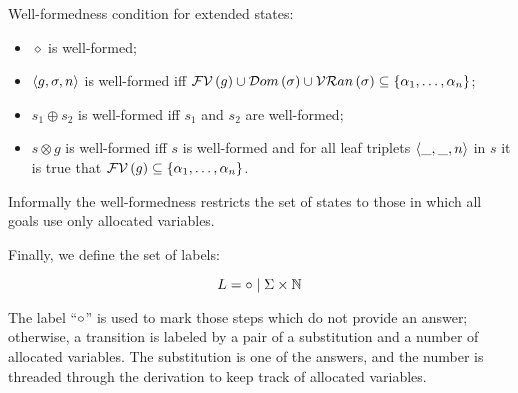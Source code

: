 \begin{definition}
  Well-formedness condition for extended states:
  
  \begin{itemize}
  \item $\diamond$ is well-formed;
  \item $\left<{g, \sigma, n}\right>$ is well-formed iff $\mathcal{FV}\,({g})\cup\mathcal{D}om\,({\sigma})\cup\mathcal{VR}an\,({\sigma})\subseteq\{\alpha_1,\dots,\alpha_n\}$;
  \item $s_1\oplus s_2$ is well-formed iff $s_1$ and $s_2$ are well-formed;
  \item $s\otimes g$ is well-formed iff $s$ is well-formed and for all leaf triplets $\left<{\_,\_,n}\right>$ in $s$ it is true that $\mathcal{FV}\,({g})\subseteq\{\alpha_1,\dots,\alpha_n\}$.
  \end{itemize}
  
\end{definition}

Informally the well-formedness restricts the set of states to those in which all goals use only allocated variables.

Finally, we define the set of labels:

\[
L = \circ \mid \Sigma\times \mathbb{N}
\]

The label ``$\circ$'' is used to mark those steps which do not provide an answer; otherwise, a transition is labeled by a pair of a substitution and a number of allocated
variables. The substitution is one of the answers, and the number is threaded through the derivation to keep track of allocated variables.

